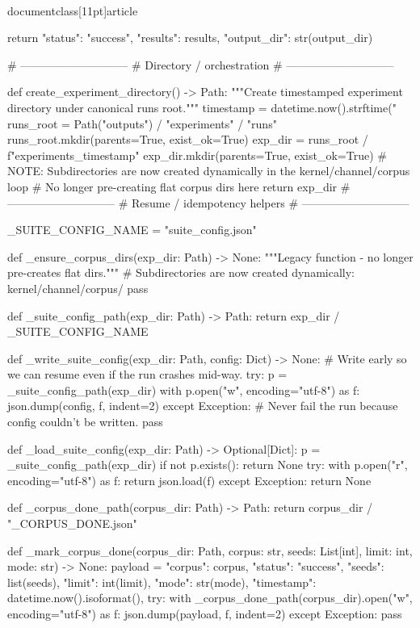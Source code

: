\\documentclass[11pt]{article}
\begin{document}
\begin{CodeBlock}
    return {"status": "success", "results": results, "output_dir": str(output_dir)}


# -----------------------------
# Directory / orchestration
# -----------------------------

def create_experiment_directory() -> Path:
    """Create timestamped experiment directory under canonical runs root."""
    timestamp = datetime.now().strftime("%
    runs_root = Path("outputs") / "experiments" / "runs"
    runs_root.mkdir(parents=True, exist_ok=True)
    exp_dir = runs_root / f"experiments_{timestamp}"
    exp_dir.mkdir(parents=True, exist_ok=True)
    # NOTE: Subdirectories are now created dynamically in the kernel/channel/corpus loop
    # No longer pre-creating flat corpus dirs here
    return exp_dir
# -----------------------------
# Resume / idempotency helpers
# -----------------------------

_SUITE_CONFIG_NAME = "suite_config.json"

def _ensure_corpus_dirs(exp_dir: Path) -> None:
    """Legacy function - no longer pre-creates flat dirs."""
    # Subdirectories are now created dynamically: kernel/channel/corpus/
    pass

def _suite_config_path(exp_dir: Path) -> Path:
    return exp_dir / _SUITE_CONFIG_NAME

def _write_suite_config(exp_dir: Path, config: Dict) -> None:
    # Write early so we can resume even if the run crashes mid-way.
    try:
        p = _suite_config_path(exp_dir)
        with p.open("w", encoding="utf-8") as f:
            json.dump(config, f, indent=2)
    except Exception:
        # Never fail the run because config couldn't be written.
        pass

def _load_suite_config(exp_dir: Path) -> Optional[Dict]:
    p = _suite_config_path(exp_dir)
    if not p.exists():
        return None
    try:
        with p.open("r", encoding="utf-8") as f:
            return json.load(f)
    except Exception:
        return None

def _corpus_done_path(corpus_dir: Path) -> Path:
    return corpus_dir / "_CORPUS_DONE.json"

def _mark_corpus_done(corpus_dir: Path, corpus: str, seeds: List[int], limit: int, mode: str) -> None:
    payload = {
        "corpus": corpus,
        "status": "success",
        "seeds": list(seeds),
        "limit": int(limit),
        "mode": str(mode),
        "timestamp": datetime.now().isoformat(),
    }
    try:
        with _corpus_done_path(corpus_dir).open("w", encoding="utf-8") as f:
            json.dump(payload, f, indent=2)
    except Exception:
        pass


\end{CodeBlock}
\end{document}

